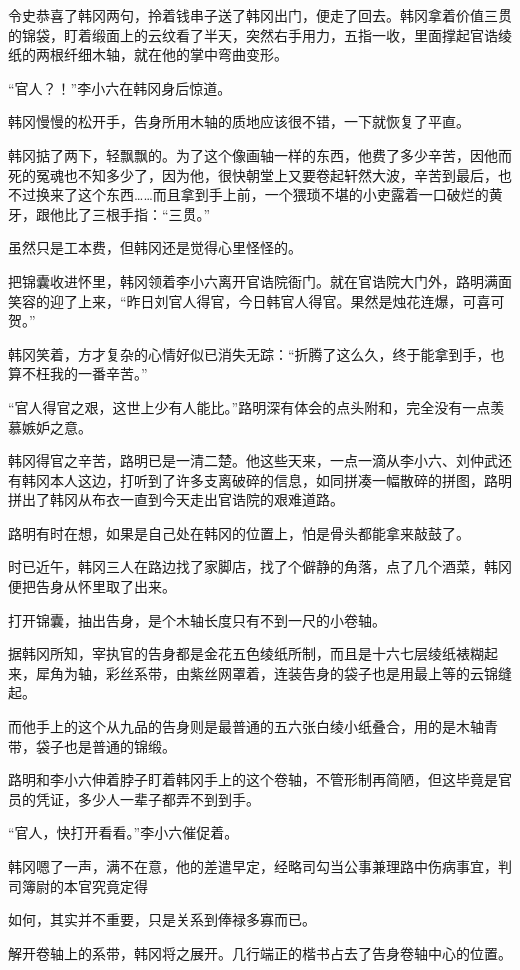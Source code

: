 令史恭喜了韩冈两句，拎着钱串子送了韩冈出门，便走了回去。韩冈拿着价值三贯的锦袋，盯着缎面上的云纹看了半天，突然右手用力，五指一收，里面撑起官诰绫纸的两根纤细木轴，就在他的掌中弯曲变形。

“官人？！”李小六在韩冈身后惊道。

韩冈慢慢的松开手，告身所用木轴的质地应该很不错，一下就恢复了平直。

韩冈掂了两下，轻飘飘的。为了这个像画轴一样的东西，他费了多少辛苦，因他而死的冤魂也不知多少了，因为他，很快朝堂上又要卷起轩然大波，辛苦到最后，也不过换来了这个东西……而且拿到手上前，一个猥琐不堪的小吏露着一口破烂的黄牙，跟他比了三根手指：“三贯。”

虽然只是工本费，但韩冈还是觉得心里怪怪的。

把锦囊收进怀里，韩冈领着李小六离开官诰院衙门。就在官诰院大门外，路明满面笑容的迎了上来，“昨日刘官人得官，今日韩官人得官。果然是烛花连爆，可喜可贺。”

韩冈笑着，方才复杂的心情好似已消失无踪：“折腾了这么久，终于能拿到手，也算不枉我的一番辛苦。”

“官人得官之艰，这世上少有人能比。”路明深有体会的点头附和，完全没有一点羡慕嫉妒之意。

韩冈得官之辛苦，路明已是一清二楚。他这些天来，一点一滴从李小六、刘仲武还有韩冈本人这边，打听到了许多支离破碎的信息，如同拼凑一幅散碎的拼图，路明拼出了韩冈从布衣一直到今天走出官诰院的艰难道路。

路明有时在想，如果是自己处在韩冈的位置上，怕是骨头都能拿来敲鼓了。

时已近午，韩冈三人在路边找了家脚店，找了个僻静的角落，点了几个酒菜，韩冈便把告身从怀里取了出来。

打开锦囊，抽出告身，是个木轴长度只有不到一尺的小卷轴。

据韩冈所知，宰执官的告身都是金花五色绫纸所制，而且是十六七层绫纸裱糊起来，犀角为轴，彩丝系带，由紫丝网罩着，连装告身的袋子也是用最上等的云锦缝起。

而他手上的这个从九品的告身则是最普通的五六张白绫小纸叠合，用的是木轴青带，袋子也是普通的锦缎。

路明和李小六伸着脖子盯着韩冈手上的这个卷轴，不管形制再简陋，但这毕竟是官员的凭证，多少人一辈子都弄不到到手。

“官人，快打开看看。”李小六催促着。

韩冈嗯了一声，满不在意，他的差遣早定，经略司勾当公事兼理路中伤病事宜，判司簿尉的本官究竟定得

如何，其实并不重要，只是关系到俸禄多寡而已。

解开卷轴上的系带，韩冈将之展开。几行端正的楷书占去了告身卷轴中心的位置。

